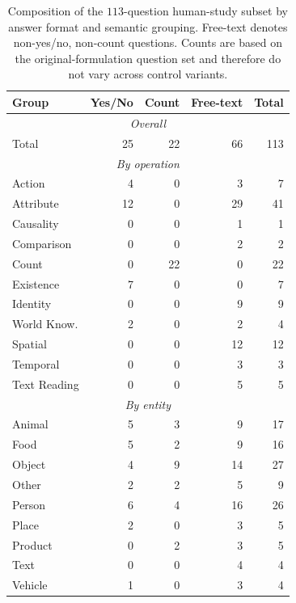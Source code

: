 \begin{table}[ht]
\centering
\small
\setlength{\tabcolsep}{5pt}

\caption{Composition of the $113$-question human-study subset by answer format and semantic grouping. Free-text denotes non-yes/no, non-count questions. Counts are based on the original-formulation question set and therefore do not vary across control variants.}
\label{tab:q113_sample_composition}
\begin{tabular}{lrrrr}
\toprule
Group & Yes/No & Count & Free-text & Total \\
\midrule
\multicolumn{5}{c}{\textit{Overall}} \\
\midrule
Total & 25 & 22 & 66 & 113 \\
\midrule
\multicolumn{5}{c}{\textit{By operation}} \\
\midrule
Action & 4 & 0 & 3 & 7 \\
Attribute & 12 & 0 & 29 & 41 \\
Causality & 0 & 0 & 1 & 1 \\
Comparison & 0 & 0 & 2 & 2 \\
Count & 0 & 22 & 0 & 22 \\
Existence & 7 & 0 & 0 & 7 \\
Identity & 0 & 0 & 9 & 9 \\
World Know. & 2 & 0 & 2 & 4 \\
Spatial & 0 & 0 & 12 & 12 \\
Temporal & 0 & 0 & 3 & 3 \\
Text Reading & 0 & 0 & 5 & 5 \\
\midrule
\multicolumn{5}{c}{\textit{By entity}} \\
\midrule
Animal & 5 & 3 & 9 & 17 \\
Food & 5 & 2 & 9 & 16 \\
Object & 4 & 9 & 14 & 27 \\
Other & 2 & 2 & 5 & 9 \\
Person & 6 & 4 & 16 & 26 \\
Place & 2 & 0 & 3 & 5 \\
Product & 0 & 2 & 3 & 5 \\
Text & 0 & 0 & 4 & 4 \\
Vehicle & 1 & 0 & 3 & 4 \\
\bottomrule
\end{tabular}
\end{table}
